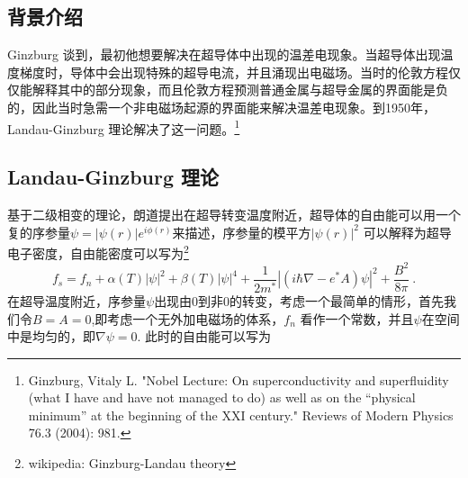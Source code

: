 
\begin{issues}
\issueTODO
\end{issues}

\subsection{背景介绍}
Ginzburg 谈到，最初他想要解决在超导体中出现的温差电现象。当超导体出现温度梯度时，导体中会出现特殊的超导电流，并且涌现出电磁场。当时的伦敦方程仅仅能解释其中的部分现象，而且伦敦方程预测普通金属与超导金属的界面能是负的，因此当时急需一个非电磁场起源的界面能来解决温差电现象。到1950年，Landau-Ginzburg 理论解决了这一问题。\footnote{Ginzburg, Vitaly L. "Nobel Lecture: On superconductivity and superfluidity (what I have and have not managed to do) as well as on the “physical minimum” at the beginning of the XXI century." Reviews of Modern Physics 76.3 (2004): 981.}
\subsection{Landau-Ginzburg 理论}
基于二级相变的理论，朗道提出在超导转变温度附近，超导体的自由能可以用一个复的序参量$\psi = |\psi(r)|e^{i\phi(r)}$来描述，序参量的模平方$|\psi(r)|^2$ 可以解释为超导电子密度，自由能密度可以写为\footnote{wikipedia: Ginzburg-Landau theory}
\begin{equation}
f_s = f_n + \alpha(T) |\psi|^2 + \beta(T) |\psi|^4 + \frac{1}{2m^*} \left| \left(i\hbar \nabla - e^* A \right)\psi \right|^2 + \frac{B^2}{8\pi}~.
\end{equation}
在超导温度附近，序参量$\psi$出现由0到非0的转变，考虑一个最简单的情形，首先我们令$B=A = 0$,即考虑一个无外加电磁场的体系，$f_n$ 看作一个常数，并且$\psi$在空间中是均匀的，即$\nabla \psi = 0$. 此时的自由能可以写为
\begin{equation}

\end{equation}
